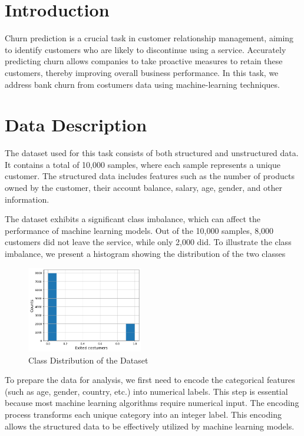 \documentclass[12pt]{article}
\begin{document}
\section{Introduction}
Churn prediction is a crucial task in customer relationship management, aiming to identify customers who are likely to discontinue using a service. Accurately predicting churn allows companies to take proactive measures to retain these customers, thereby improving overall business performance. In this task, we address bank churn from costumers data using machine-learning techniques. 

\section{Data Description}
The dataset used for this task consists of both structured and unstructured data. It contains a total of 10,000 samples, where each sample represents a unique customer. The structured data includes features such as the number of products owned by the customer, their account balance, salary, age, gender, and other information. 

The dataset exhibits a significant class imbalance, which can affect the performance of machine learning models. Out of the 10,000 samples, 8,000 customers did not leave the service, while only 2,000 did. To illustrate the class imbalance, we present a histogram showing the distribution of the two classes

\begin{figure}[h!]
    \centering
    \includegraphics[width=0.45\textwidth]{figures/class_distribution.png}
    \caption{Class Distribution of the Dataset}
    \label{fig:class_distribution}
\end{figure}

To prepare the data for analysis, we first need to encode the categorical features (such as age, gender, country, etc.) into numerical labels. This step is essential because most machine learning algorithms require numerical input. The encoding process transforms each unique category into an integer label. This encoding allows the structured data to be effectively utilized by machine learning models.
\end{document}
